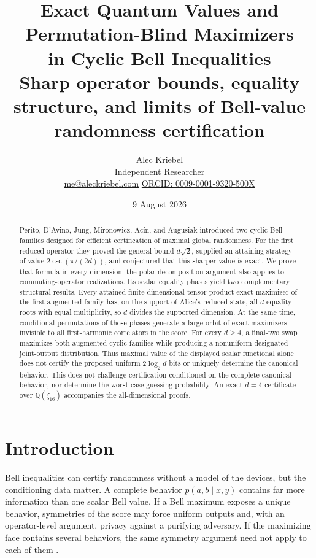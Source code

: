 \documentclass[11pt]{article}
\title{\vspace{-1.35cm}
\textbf{Exact Quantum Values and Permutation-Blind Maximizers}\\[-0.05em]
\textbf{in Cyclic Bell Inequalities}\\[0.45em]
\large Sharp operator bounds, equality structure, and limits of Bell-value randomness certification}
\author{Alec Kriebel\\
\small Independent Researcher\\[-0.1em]
\small \href{mailto:me@aleckriebel.com}{me@aleckriebel.com}
\quad
\href{https://orcid.org/0009-0001-9320-500X}
{ORCID: 0009-0001-9320-500X}}
\date{9 August 2026}
\theoremstyle{definition}
\theoremstyle{remark}
\begin{document}
\maketitle

\begin{abstract}
Perito, D'Avino, Jung, Mironowicz, Ac\'in, and Augusiak introduced two
cyclic Bell families designed for efficient certification of maximal global
randomness.  For the first reduced operator they proved the general bound
\(d\sqrt2\), supplied an attaining strategy of value
\(2\csc(\pi/(2d))\), and conjectured that this sharper value is exact.  We
prove that formula in every dimension; the polar-decomposition argument also
applies to commuting-operator realizations.  Its scalar equality phases yield
two complementary structural results.  Every attained finite-dimensional
tensor-product exact maximizer of the first augmented family has, on the
support of Alice's reduced state, all \(d\) equality roots with equal
multiplicity, so \(d\) divides the supported dimension.  At the same time,
conditional permutations
of those phases generate a large orbit of exact maximizers invisible to all
first-harmonic correlators in the score.  For every \(d\geq4\), a final-two
swap maximizes both augmented cyclic families while producing a nonuniform
designated joint-output distribution.  Thus maximal value of the displayed
scalar functional alone does not certify the proposed uniform
\(2\log_2d\) bits or uniquely determine the canonical behavior.  This does
not challenge certification conditioned on the complete canonical behavior,
nor determine the worst-case guessing probability.  An exact \(d=4\)
certificate over \(\mathbb Q(\zeta_{16})\) accompanies the all-dimensional
proofs.
\end{abstract}

\section{Introduction}

Bell inequalities can certify randomness without a model of the devices, but
the conditioning data matter.  A complete behavior
\(p(a,b\mid x,y)\) contains far more information than one scalar Bell value.
If a Bell maximum exposes a unique behavior, symmetries of the score may force
uniform outputs and, with an operator-level argument, privacy against a
purifying adversary.  If the maximizing face contains several behaviors, the
same symmetry argument need not apply to each of them
\cite{DharaEtAl2013,NietoSillerasEtAl2014,BancalEtAl2014}.
\end{document}
